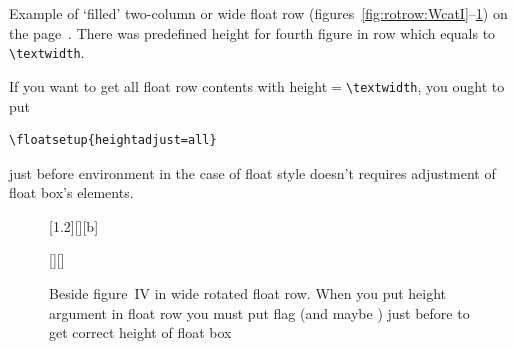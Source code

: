 \begin{sidewaystextbox*}
\wideemptyfloatpage
\tcapside[1.2\hsize]
{\TEXTBOX[ \text.]}
{\caption{Beside caption. \text. \text. \text}%
\label{rot:wbeside:text}}
\end{sidewaystextbox*}

\Text

\fi
\clearpage

\newlengthtocommand\setlength\rottextwidth{\textwidth}

Example of `filled' two-column or wide float row
(figures~\ref{fig:rotrow:WcatI}--\ref{fig:rotrow:FcatI})
on the page~\pageref{fig:rotrow:WcatI}.
There was predefined height for fourth figure in row which equals to \verb|\textwidth|.

If you want to get all float row contents with height${}={}$\verb|\textwidth|, you ought to put
\begin{verbatim}
\floatsetup{heightadjust=all}
\end{verbatim}
just before  environment in the case of float style doesn't requires adjustment of float box's
elements.

\begin{figure}
\wideemptyfloatpage
\begin{floatrow}[4]
%
{\caption{Beside figure~I in wide rotated float row. Vertically centered}%
\label{fig:rotrow:WcatI}}%

[1.2\FBwidth][][b]
{\caption{Beside figure~II in wide rotated float row. Flushed to bottom of box}%
\label{fig:rotrow:BcatI}%
}%
{}%

%
{\caption{Beside figure~III in wide rotated float row. Flushed to top of object box}%
\label{fig:rotrow:mouseI}}%

[\Xhsize][\rottextwidth]
{\caption{Beside figure~IV in wide rotated float row.
When you put height argument in float row you must
put flag \protect{} (and maybe \protect{})
just before  to get
correct height of float box}\label{fig:rotrow:FcatI}}%
{\Resizebox\hsize{}}
\end{floatrow}
\end{figure}

